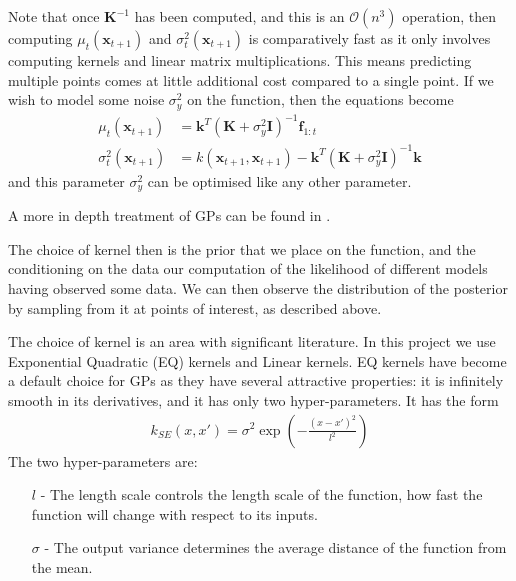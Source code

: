 Note that once \( \mathbf{K}^{-1} \) has been computed, and this is an \( \mathcal{O}(n^3) \) operation, then computing \( \mu_t(\mathbf{x}_{t+1}) \) and \( \sigma_t^2(\mathbf{x}_{t+1}) \) is comparatively fast as it only involves computing kernels and linear matrix multiplications. This means predicting multiple points comes at little additional cost compared to a single point. If we wish to model some noise \( \sigma_y^2 \) on the function, then the equations become
\begin{align}
	\mu_t(\mathbf{x}_{t+1}) &= \mathbf{k}^T \left(\mathbf{K} + \sigma_y^2\mathbf{I} \right)^{-1} \mathbf{f}_{1:t}\\
	\sigma_t^2(\mathbf{x}_{t+1}) &= k(\mathbf{x}_{t+1}, \mathbf{x}_{t+1}) - \mathbf{k}^T\left(\mathbf{K} + \sigma_y^2\mathbf{I} \right)^{-1}\mathbf{k}
\end{align}
and this parameter \( \sigma_y^2 \) can be optimised like any other parameter.

A more in depth treatment of GPs can be found in \citet{williams2006gaussian}.

The choice of kernel then is the prior that we place on the function, and the conditioning on the data our computation of the likelihood of different models having observed some data. We can then observe the distribution of the posterior by sampling from it at points of interest, as described above.

The choice of kernel is an area with significant literature. In this project we use  Exponential Quadratic (EQ) kernels and Linear kernels. EQ kernels have become a default choice for GPs as they have several attractive properties: it is infinitely smooth in its derivatives, and it has only two hyper-parameters. It has the form
\begin{align}
	k_{SE}(x, x') = \sigma^2 \exp\left(-\frac{(x - x')^2}{l^2}\right)
\end{align} 
The two hyper-parameters are:
\begin{itemize}
	\item[\( l \)]  - The length scale controls the length scale of the function, how fast the function will change with respect to its inputs.
	\item[\( \sigma \)] - The output variance determines the average distance of the function from the mean.
\end{itemize}

